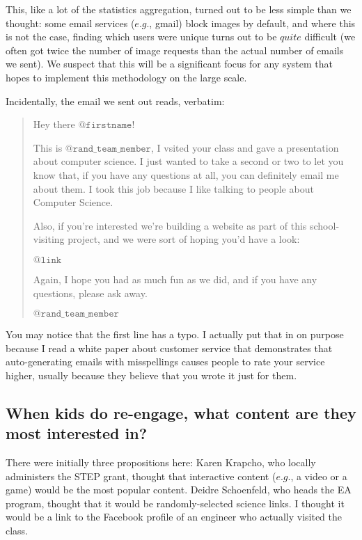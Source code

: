 \documentclass[11pt,a4paper]{article}
\begin{document}
This, like a lot of the statistics aggregation, turned out to be less simple than we thought: some email services ($\textit{e.g.}$, gmail) block images by default, and where this is not the case, finding which users were unique turns out to be $\textit{quite}$ difficult (we often got twice the number of image requests than the actual number of emails we sent). We suspect that this will be a significant focus for any system that hopes to implement this methodology on the large scale.

Incidentally, the email we sent out reads, verbatim:
	
	\begin{quote}
	Hey there $\texttt{@firstname}$!
	
	This is $\texttt{@rand\_team\_member}$, I vsited your class and gave a presentation about computer science. I just wanted to take a second or two to let you know that, if you have any questions at all, you can definitely email me about them. I took this job because I like talking to people about Computer Science.
	
	Also, if you're interested we're building a website as part of this school-visiting project, and we were sort of hoping you'd have a look:
	
	$\texttt{@link}$
	
	Again, I hope you had as much fun as we did, and if you have any questions, please ask away.
	
	$\texttt{@rand\_team\_member}$
	\end{quote}

You may notice that the first line has a typo. I actually put that in on purpose because I read a white paper about customer service that demonstrates that auto-generating emails with misspellings causes people to rate your service higher, usually because they believe that you wrote it just for them.

\subsection{When kids do re-engage, what content are they most interested in?}

There were initially three propositions here: Karen Krapcho, who locally administers the STEP grant, thought that interactive content ($\textit{e.g.}$, a video or a game) would be the most popular content. Deidre Schoenfeld, who heads the EA program, thought that it would be randomly-selected science links. I thought it would be a link to the Facebook profile of an engineer who actually visited the class.
\end{document}
